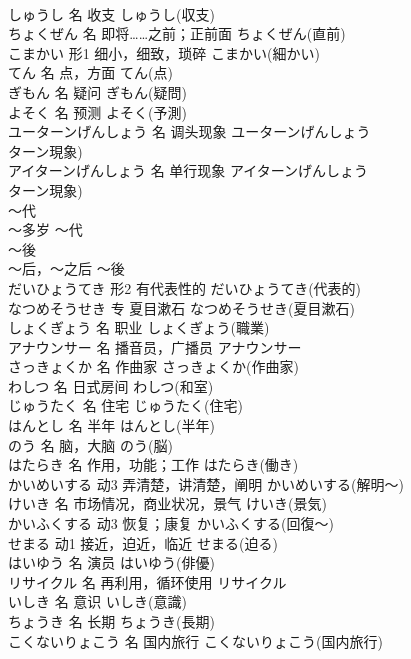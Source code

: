 \documentclass[8pt]{extreport}
\begin{document}
\begin{CJK}{UTF8}{min}
\\	しゅうし	名	收支	しゅうし(収支)	
\\	ちょくぜん	名	即将……之前；正前面	ちょくぜん(直前)	
\\	こまかい	形1	细小，细致，琐碎	こまかい(細かい)	
\\	てん	名	点，方面	てん(点)	
\\	ぎもん	名	疑问	ぎもん(疑問)	
\\	よそく	名	预测	よそく(予測)	
\\	ユーターンげんしょう	名	调头现象	ユーターンげんしょう
\\	ターン現象)	
\\	アイターンげんしょう	名	单行现象	アイターンげんしょう
\\	ターン現象)	
\\	～代	
\\	～多岁	～代	
\\	～後	
\\	～后，～之后	～後	
\\	だいひょうてき	形2	有代表性的	だいひょうてき(代表的)	
\\	なつめそうせき	专	夏目漱石	なつめそうせき(夏目漱石)	
\\	しょくぎょう	名	职业	しょくぎょう(職業)	
\\	アナウンサー	名	播音员，广播员	アナウンサー	
\\	さっきょくか	名	作曲家	さっきょくか(作曲家)	
\\	わしつ	名	日式房间	わしつ(和室)	
\\	じゅうたく	名	住宅	じゅうたく(住宅)	
\\	はんとし	名	半年	はんとし(半年)	
\\	のう	名	脑，大脑	のう(脳)	
\\	はたらき	名	作用，功能；工作	はたらき(働き)	
\\	かいめいする	动3	弄清楚，讲清楚，阐明	かいめいする(解明～)	
\\	けいき	名	市场情况，商业状况，景气	けいき(景気)	
\\	かいふくする	动3	恢复；康复	かいふくする(回復～)	
\\	せまる	动1	接近，迫近，临近	せまる(迫る)	
\\	はいゆう	名	演员	はいゆう(俳優)	
\\	リサイクル	名	再利用，循环使用	リサイクル	
\\	いしき	名	意识	いしき(意識)	
\\	ちょうき	名	长期	ちょうき(長期)	
\\	こくないりょこう	名	国内旅行	こくないりょこう(国内旅行)	

\end{CJK}
\end{document}
